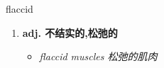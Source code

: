 
\begin{frame}
{\huge flaccid}
\begin{center}
\begin{enumerate}\Large
  \item \textbf{adj. 不结实的,松弛的}
  \begin{itemize}
    \item \em{\Large{flaccid muscles 松弛的肌肉}}
  \end{itemize}
\end{enumerate}
\end{center}
\end{frame}
